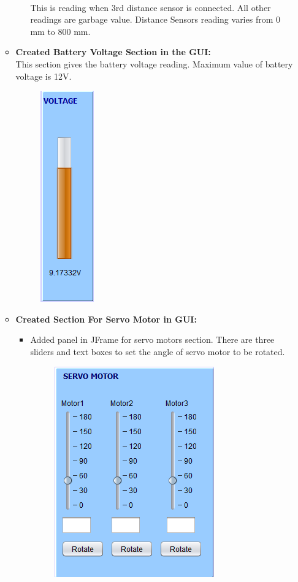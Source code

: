 \documentclass{article}
\begin{document}
\begin{enumerate}
\begin{itemize}
\begin{itemize}
\begin{figure}[h]
\begin{center}
					\end{center}
				\end{figure} \\
				This is reading when 3rd distance sensor is connected. All other readings are garbage value. Distance Sensors reading varies from 0 mm to 800 mm.
			\end{itemize} 
			\item \textbf{Created Battery Voltage Section in the GUI:}\\
			 This section gives the battery voltage reading. Maximum value of battery voltage is 12V.
			 \begin{figure}[h]
			 	\begin{center}
			 		\includegraphics[scale=0.75]{batteryvoltage.png}
			 	\end{center}
			 \end{figure}
			 \item \textbf{Created Section For Servo Motor in GUI:} 
			 \begin{itemize}
			 	\item Added panel in JFrame for servo motors section. There are three sliders and text boxes to set the angle of servo motor to be rotated.
			 	\newpage
			 	\begin{figure}[h]
			 		\begin{center}
			 			\includegraphics[scale=0.75]{servomotor.png}

\end{center}
\end{figure}
\end{itemize}
\end{itemize}
\end{enumerate}
\end{document}

